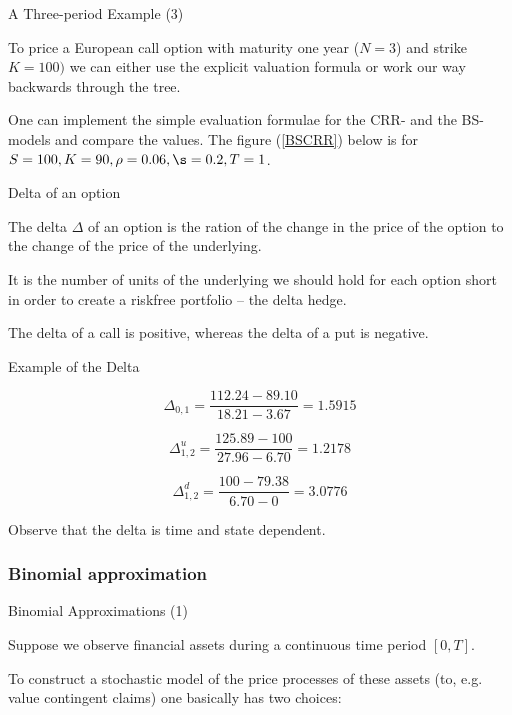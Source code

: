 { A Three-period Example (3)}


	To price a European call option with maturity one year ($N=3$) and
strike $K=100)$ we can either use the explicit valuation formula or work our way backwards through the tree.

	One can implement the simple evaluation formulae for the CRR- and
the BS-models and compare the values. The figure (\ref{BSCRR}) below is for
$S=100, K=90, \rho=0.06, \s=0.2, T=1$.


{Delta  of an option}


	The delta $\Delta$ of an option is the ration of the change in the price of the option to the
change of the price of the underlying.

	It is the number of units of the underlying we should hold for each option short in order to
create a riskfree portfolio -- the delta hedge.

	The delta of a call is positive, whereas the delta of a put is negative.


{Example of the Delta}


$$
\Delta_{0,1}=\frac{112.24-89.10}{18.21-3.67}=1.5915
$$

$$
\Delta^u_{1,2}=\frac{125.89-100}{27.96-6.70}=1.2178
$$

$$
\Delta^d_{1,2}=\frac{100-79.38}{6.70-0}=3.0776
$$

	Observe that the delta is time and state dependent.


\subsubsection{Binomial approximation}

{Binomial Approximations (1)}


	Suppose we observe financial assets during a continuous time
period $[0,T]$.

	To construct a stochastic model of the price
processes of these assets (to, e.g. value contingent claims) one
basically has two choices:


